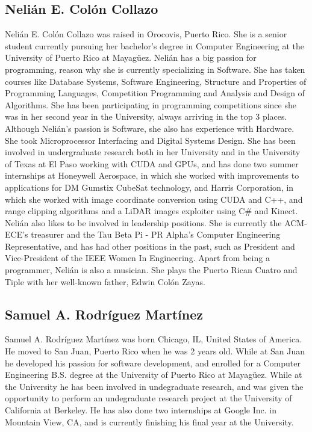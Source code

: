 \label{sec:bios}

\subsection{Nelián E. Colón Collazo}

Nelián E. Colón Collazo was raised in Orocovis, Puerto Rico. She is a senior
student currently pursuing her bachelor's degree in Computer Engineering at the
University of Puerto Rico at Mayagüez. Nelián has a big passion for programming,
reason why she is currently specializing in Software. She has taken courses like
Database Systems, Software Engineering, Structure and Properties of 
Programming Languages, Competition Programming and Analysis and 
Design of Algorithms. She has been participating in programming competitions 
since she was in her second year in the University, always arriving in the top 
3 places. Although Nelián's passion is Software, she also has experience 
with Hardware. She took Microprocessor Interfacing and Digital Systems Design. 
She has been involved in undergraduate research both in her University 
and in the University of Texas at El Paso working with CUDA and GPUs, 
and has done two summer internships at Honeywell Aerospace, in which she worked 
with improvements to applications for DM Gumstix CubeSat technology, 
and Harris Corporation, in which she worked with image coordinate conversion 
using CUDA and C++, and range clipping algorithms and a LiDAR images exploiter 
using C\# and Kinect. Nelián also likes to be involved in leadership positions. 
She is currently the ACM-ECE's treasurer and the Tau Beta Pi - PR Alpha's 
Computer Engineering Representative, and has had other positions in the past, such as
President and Vice-President of the IEEE Women In Engineering. Apart from being 
a programmer, Nelián is also a musician. She plays the Puerto Rican Cuatro and Tiple 
with her well-known father, Edwin Colón Zayas.

\subsection{Samuel A. Rodríguez Martínez}

Samuel A. Rodríguez Martínez was born Chicago, IL, United States of America. He
moved to San Juan, Puerto Rico when he was 2 years old. While at San Juan he
developed his passion for software development, and enrolled for a Computer
Engineering B.S. degree at the University of Puerto Rico at Mayagüez. While at
the University he has been involved in undegraduate research, and was given the
opportunity to perform an undegraduate research project at the University of
California at Berkeley. He has also done two internships at Google Inc. in
Mountain View, CA, and is currently finishing his final year at the University.

